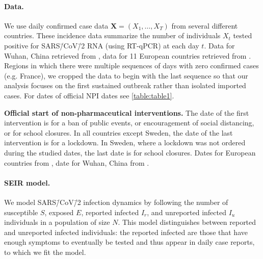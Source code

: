 \documentclass[12pt]{extarticle}
\let\vec\mathbf
\begin{document}
\paragraph*{Data.} 
We use daily confirmed case data $\vec{X}=(X_1, \ldots, X_T)$ from several different countries. These incidence data summarize the number of individuals $X_t$ tested positive for SARS\=/CoV\=/2 RNA (using RT-qPCR) at each day $t$.
Data for Wuhan, China retrieved from \citet{Pei2020}, data for 11 European countries retrieved from \citet{Flaxman2020}. 
Regions in which there were multiple sequences of days with zero confirmed cases (e.g. France), we cropped the data to begin with the last sequence so that our analysis focuses on the first sustained outbreak rather than isolated imported cases. 
For dates of official NPI dates see \autoref{table:table1}.


 
\begin{table}[h]
\centering
{}
\caption{
\textbf{Official start of non-pharmaceutical interventions.}
The date of the first intervention is for a ban of public events, or encouragement of social distancing, or for school closures.
In all countries except Sweden, the date of the last intervention is for a lockdown. In Sweden, where a lockdown was not ordered during the studied dates, the last date is for school closures. Dates for European countries from \citet{Flaxman2020}, date for Wuhan, China from \citet{Pei2020}.
}
\label{table:table1}
\end{table}



\paragraph*{SEIR model.}
We model SARS\=/CoV\=/2 infection dynamics by following the number of susceptible $S$, exposed $E$, reported infected $I_r$, and unreported infected $I_u$ individuals in a population of size $N$.
This model distinguishes between reported and unreported infected individuals: the reported infected are those that have enough symptoms to eventually be tested and thus appear in daily case reports, to which we fit the model.
\end{document}
